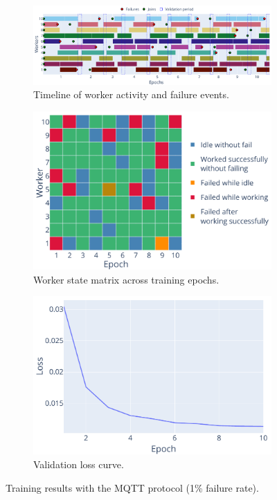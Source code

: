 \begin{figure}[!htb]
    \centering
    \begin{subfigure}[b]{\linewidth}
        \centering
        \includegraphics[width=\linewidth]{figs/scenario2/mqtt_timeline.pdf}
        \caption{Timeline of worker activity and failure events.}
        \label{fig:timeline_mqtt}
    \end{subfigure}
    \begin{subfigure}[b]{0.6\linewidth}
        \centering
        \includegraphics[width=\linewidth]{figs/scenario2/mqtt_status.pdf}
        \caption{Worker state matrix across training epochs.}
        \label{fig:states_mqtt}
    \end{subfigure}
    \begin{subfigure}[b]{0.6\linewidth}
        \centering
        \includegraphics[width=\linewidth]{figs/scenario2/mqtt_loss.pdf}
        \caption{Validation loss curve.}
        \label{fig:loss_mqtt}
    \end{subfigure}
    \caption[]{Training results with the MQTT protocol (1\% failure rate).}
    \label{fig:results_mqtt}
\end{figure}


